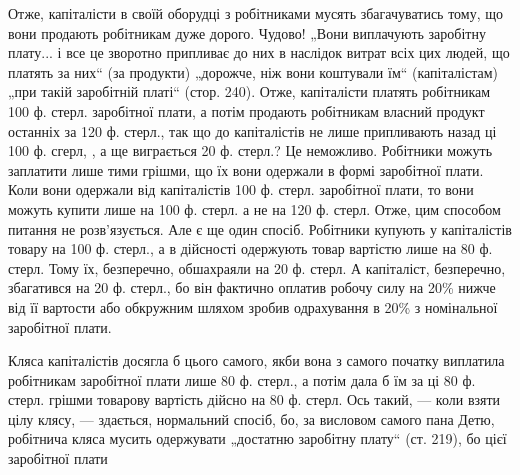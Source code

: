 Отже, капіталісти в своїй оборудці з робітниками мусять збагачуватись
тому, що вони продають робітникам дуже дорого. Чудово! „Вони
виплачують заробітну плату... і все це зворотно припливає до них в наслідок
витрат всіх цих людей, що платять за них“ (за продукти) „дорожче,
ніж вони коштували їм“ (капіталістам) „при такій заробітній
платі“ (стор. 240). Отже, капіталісти платять робітникам 100 ф.
стерл. заробітної плати, а потім продають робітникам власний продукт
останніх за 120 ф. стерл., так що до капіталістів не лише припливають
назад ці 100 ф. сгерл, , а ще виграється 20 ф. стерл.? Це неможливо.
Робітники можуть заплатити лише тими грішми, що їх вони одержали
в формі заробітної плати. Коли вони одержали від капіталістів 100 ф.
стерл. заробітної плати, то вони можуть купити лише на 100 ф. стерл.
а не на 120 ф. стерл. Отже, цим способом питання не розв’язується. Але
є ще один спосіб. Робітники купують у капіталістів товару на 100 ф.
стерл., а в дійсності одержують товар вартістю лише на 80 ф. стерл.
Тому їх, безперечно, обшахраяли на 20 ф. стерл. А капіталіст, безперечно,
збагатився на 20 ф. стерл., бо він фактично оплатив робочу силу
на 20\% нижче від її вартости або обкружним шляхом зробив одрахування
в 20\% з номінальної заробітної плати.

Кляса капіталістів досягла б цього самого, якби вона з самого початку
виплатила робітникам заробітної плати лише 80 ф. стерл., а потім
дала б їм за ці 80 ф. стерл. грішми товарову вартість дійсно на 80 ф.
стерл. Ось такий, — коли взяти цілу клясу, — здається, нормальний спосіб,
бо, за висловом самого пана Детю, робітнича кляса мусить одержувати
„достатню заробітну плату“ (ст. 219), бо цієї заробітної плати
\parbreak{}  %
